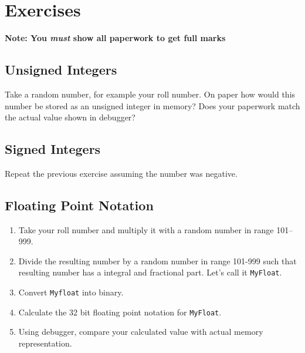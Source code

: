 \documentclass{article}
\begin{document}
\section{Exercises}
\textbf{Note: You \emph{must} show all paperwork to get full marks}
\subsection{Unsigned Integers}
Take a random number, for example your roll number. On paper how would this number be stored as an unsigned integer in memory? Does your paperwork match the actual value shown in debugger?
\subsection{Signed Integers}
Repeat the previous exercise assuming the number was negative.
\subsection{Floating Point Notation}
\begin{enumerate}
\item Take your roll number and multiply it with a random number in range 101--999.
\item Divide the resulting number by a random number in range 101-999 such that resulting number has a integral and fractional part. Let's call it \verb|MyFloat|.
\item Convert \verb|Myfloat| into binary.
\item Calculate the 32 bit floating point notation for \verb|MyFloat|.
\item Using debugger, compare your calculated value with actual memory representation.
\end{enumerate}
\end{document}
